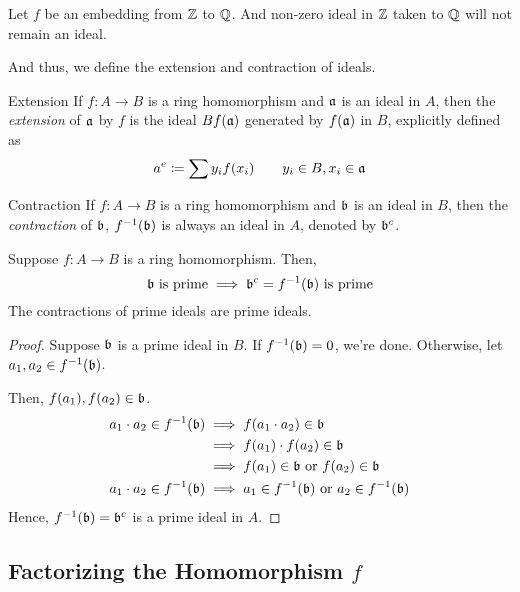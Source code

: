 \begin{example}{}{}
	Let \(f\) be an embedding from \(\ZZ\) to \(\QQ\).
	And non-zero ideal in \(\ZZ\) taken to \(\QQ\) will not remain an ideal.
\end{example}

And thus, we define the extension and contraction of ideals.

\begin{defn}{Extension}{}
	If \(f\colon A \to B\) is a ring homomorphism and \(\mathfrak{a}\) is an ideal
	in \(A\), then the \emph{extension} of \(\mathfrak{a}\) by \(f\) is the ideal
	\(Bf(\mathfrak{a})\) generated by \(f(\mathfrak{a})\) in \(B\), explicitly defined as
	\[
		a^e \coloneqq \sum y_i f(x_i) \quad\quad y_i \in B, x_i \in \mathfrak{a}
	\]
\end{defn}

\begin{defn}{Contraction}{}
	If \(f\colon A \to B\) is a ring homomorphism and \(\mathfrak{b}\) is an ideal
	in \(B\), then the \emph{contraction} of \(\mathfrak{b}\), \(f^{-1}(\mathfrak{b})\)
	is always an ideal in \(A\), denoted by \(\mathfrak{b}^c\).
\end{defn}

\begin{proposition}{}{}
	Suppose \(f\colon A \to B\) is a ring homomorphism.
	Then,
	\[
		\mathfrak{b} \text{ is prime} \implies \mathfrak{b}^c = f^{-1}(\mathfrak{b}) \text{ is prime}
	\]
	The contractions of prime ideals are prime ideals.
\end{proposition}

\begin{proof}
	Suppose \(\mathfrak{b}\) is a prime ideal in \(B\).
	If \( f^{-1}(\mathfrak{b}) = 0 \), we're done.
	Otherwise, let \(a_1, a_2 \in f^{-1}(\mathfrak{b})\).

	Then, \(f(a_1), f(a_2) \in \mathfrak{b}\).
	\begin{align*}
		a_1 \cdot a_2 \in f^{-1}(\mathfrak{b})
		&\implies f(a_1 \cdot a_2) \in \mathfrak{b} \\
		&\implies f(a_1) \cdot f(a_2) \in \mathfrak{b} \\
		&\implies f(a_1) \in \mathfrak{b} \text{ or } f(a_2) \in \mathfrak{b} \\
		a_1 \cdot a_2 \in f^{-1}(\mathfrak{b})
		&\implies a_1 \in f^{-1}(\mathfrak{b}) \text{ or } a_2 \in f^{-1}(\mathfrak{b})
	\end{align*}
	Hence, \(f^{-1}(\mathfrak{b}) = \mathfrak{b}^c \) is a prime ideal in \(A\).
\end{proof}


\subsection{Factorizing the Homomorphism \(f\)}


